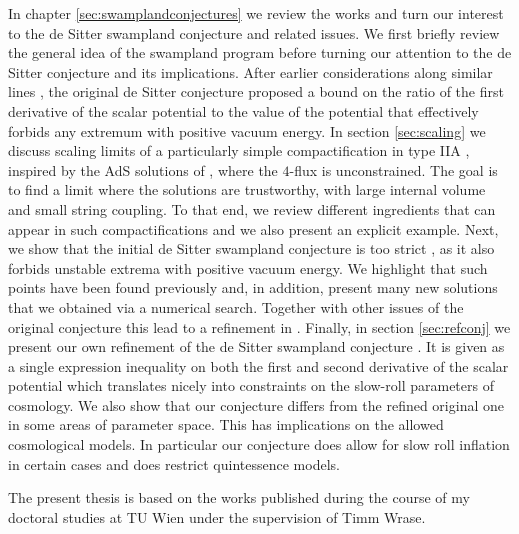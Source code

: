 \documentclass[a4paper,12pt,twoside,openright]{report}
\begin{document}
In chapter \ref{sec:swamplandconjectures} we review the works \cite{Roupec:2018mbn,Banlaki:2018ayh,Andriot:2018mav} and turn our interest to the de Sitter swampland conjecture \cite{Obied:2018sgi} and related issues. We first briefly review the general idea of the swampland program \cite{Brennan:2017rbf,Palti:2019pca,vanBeest:2021lhn} before turning our attention to the de Sitter conjecture \cite{Obied:2018sgi,Ooguri:2018wrx} and its implications. After earlier considerations along similar lines \cite{Danielsson:2018ztv}, the original de Sitter conjecture \cite{Obied:2018sgi} proposed a bound on the ratio of the first derivative of the scalar potential to the value of the potential that effectively forbids any extremum with positive vacuum energy. In section \ref{sec:scaling} we discuss scaling limits of a particularly simple compactification in type IIA \cite{Banlaki:2018ayh}, inspired by the AdS solutions of \cite{DeWolfe:2005uu}, where the $4$-flux is unconstrained. The goal is to find a limit where the solutions are trustworthy, with large internal volume and small string coupling. To that end, we review different ingredients that can appear in such compactifications and we also present an explicit example. Next, we show that the initial de Sitter swampland conjecture is too strict \cite{Roupec:2018mbn}, as it also forbids unstable extrema with positive vacuum energy. We highlight that such points have been found previously \cite{Caviezel:2008tf,Flauger:2008ad} and, in addition, present many new solutions that we obtained via a numerical search. Together with other issues of the original conjecture \cite{Denef:2018etk} this lead to a refinement in \cite{Ooguri:2018wrx}. Finally, in section \ref{sec:refconj} we present our own refinement of the de Sitter swampland conjecture \cite{Andriot:2018mav}. It is given as a single expression inequality on both the first and second derivative of the scalar potential which translates nicely into constraints on the slow-roll parameters of cosmology. We also show that our conjecture differs from the refined original one \cite{Ooguri:2018wrx} in some areas of parameter space. This has implications on the allowed cosmological models. In particular our conjecture does allow for slow roll inflation in certain cases and does restrict quintessence models.

\vspace{12pt}
The present thesis is based on the works \cite{Roupec:2018mbn,Banlaki:2018ayh,Andriot:2018mav,Cribiori:2019hod,Cribiori:2019bfx,Cribiori:2019drf,Cribiori:2019hrb,Cribiori:2020bgt} published during the course of my doctoral studies at TU Wien under the supervision of Timm Wrase.
\end{document}
